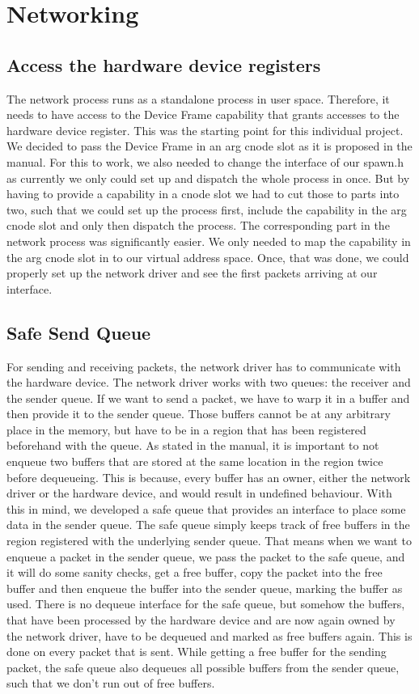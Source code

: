 \chapter{Networking}

\section{Access the hardware device registers}

The network process runs as a standalone process in user space. Therefore, it
needs to have access to the Device Frame capability that grants accesses to the
hardware device register. This was the starting point for this individual
project. We decided to pass the Device Frame in an arg cnode slot as it is
proposed in the manual. For this to work, we also needed to change the interface
of our spawn.h as currently we only could set up and dispatch the whole process
in once. But by having to provide a capability in a cnode slot we had to cut
those to parts into two, such that we could set up the process first, include
the capability in the arg cnode slot and only then dispatch the process.  The
corresponding part in the network process was significantly easier. We only
needed to map the capability in the arg cnode slot in to our virtual address
space.  Once, that was done, we could properly set up the network driver and see
the first packets arriving at our interface.


\section{Safe Send Queue}

For sending and receiving packets, the network driver has to communicate with
the hardware device.  The network driver works with two queues: the receiver and
the sender queue. If we want to send a packet, we have to warp it in a buffer
and then provide it to the sender queue. Those buffers cannot be at any
arbitrary place in the memory, but have to be in a region that has  been
registered beforehand with the queue.  As stated in the manual, it is important
to not enqueue two buffers that are stored at the same location in the region
twice before dequeueing. This is because,  every buffer has an owner, either the
network driver or the hardware device, and would result in undefined behaviour.
With this in mind, we developed a safe queue that provides an interface to place
some data in the sender queue. The safe queue simply keeps track of free buffers
in the region registered with the underlying sender queue. That means when we
want to enqueue a packet in the sender queue, we pass the packet to the safe
queue, and it will do some sanity checks, get a free buffer, copy the packet
into the free buffer and then enqueue the buffer into the sender queue, marking
the buffer as used.  There is no dequeue interface for the safe queue, but
somehow the buffers, that have been processed by the hardware device and are now
again owned by the network driver, have to be dequeued and marked as free
buffers again. This is done on every packet that is sent. While getting a free
buffer for the sending packet, the safe queue also dequeues all possible buffers
from the sender queue, such that we don't run out of free buffers.

